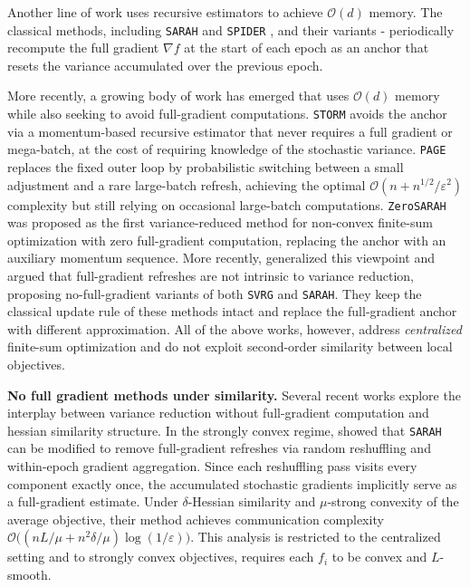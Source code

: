 \documentclass{article}
\begin{document}
Another line of work uses recursive estimators to achieve  $\mathcal{O}(d)$ memory. The classical methods, including \texttt{SARAH} 
\cite{nguyen2017sarah} and \texttt{SPIDER} \cite{fang2018spider}, and their variants - periodically recompute the full gradient $\nabla f$ at the start of each epoch as an anchor that resets the variance accumulated over the previous epoch. 

More recently, a growing body of 
work has emerged that uses $\mathcal{O}(d)$ memory while also seeking to 
avoid full-gradient computations. \texttt{STORM} 
\cite{cutkosky2020momentumbasedvariancereductionnonconvex} avoids the anchor 
via a momentum-based recursive estimator that never requires a full gradient 
or mega-batch, at the cost of requiring knowledge of the stochastic variance. 
\texttt{PAGE} \cite{li2021page} replaces the fixed outer loop by probabilistic 
switching between a small adjustment and a rare large-batch refresh, achieving 
the optimal $\mathcal{O}(n + n^{1/2}/\varepsilon^2)$ complexity but still 
relying on occasional large-batch computations. 
\texttt{ZeroSARAH} \cite{li2021zerosarah} was proposed as the first 
variance-reduced method for non-convex finite-sum optimization with zero 
full-gradient computation, replacing the anchor with an auxiliary momentum 
sequence. More recently, \cite{medyakov2025variance} generalized this 
viewpoint and argued that full-gradient refreshes are not intrinsic to 
variance reduction, proposing no-full-gradient variants of 
both \texttt{SVRG} and \texttt{SARAH}. They keep the 
classical update rule of these methods intact and 
replace the full-gradient anchor with different  
approximation.  All of the above works, however, 
address \textit{centralized} finite-sum optimization and do not exploit 
second-order similarity between local objectives.

\textbf{No full gradient methods under similarity.} 
Several recent works explore the interplay between variance reduction without 
full-gradient computation and hessian similarity structure. In the strongly convex regime, 
\cite{beznosikov2024random} showed that  \texttt{SARAH} can be modified to remove full-gradient refreshes via random reshuffling and within-epoch gradient aggregation. Since each 
reshuffling pass visits every component exactly once, the accumulated 
stochastic gradients implicitly serve as a full-gradient estimate. Under 
$\delta$-Hessian similarity and $\mu$-strong convexity of the average 
objective, their method achieves communication complexity 
$\mathcal{O}\bigl((nL/\mu + n^{2}\delta/\mu)\log(1/\varepsilon)\bigr)$. 
This analysis is restricted to 
the centralized setting and to strongly convex objectives, requires each 
$f_i$ to be convex and $L$-smooth. 
\end{document}
